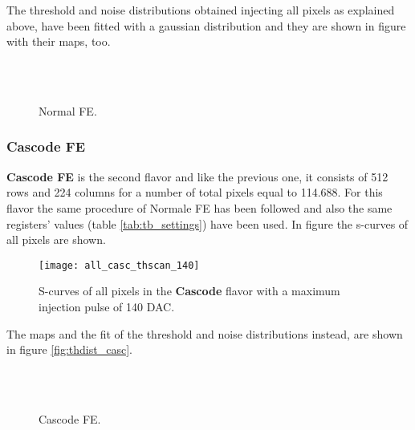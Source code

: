 The threshold and noise distributions obtained injecting all pixels as explained above, have been fitted with a gaussian distribution and they are shown in figure  with their maps, too.

\begin{figure}[h!]
\centering
{}\quad
{}\\
\quad
{}\\
\caption{Normal FE.}
\label{fig:thdist_norm}
\end{figure}



\subsubsection{Cascode FE}

\textbf{Cascode FE} is the second flavor and like the previous one, it consists of 512 rows and 224 columns for a number of total pixels equal to 114.688. For this flavor the same procedure of Normale FE has been followed and also the same registers' values (table \vref{tab:tb_settings}) have been used. %
In figure  the s-curves of all pixels are shown.

\begin{figure}[h!]
\centering
\texttt{[image: all\_casc\_thscan\_140]}
\caption{S-curves of all pixels in the \textbf{Cascode} flavor with a maximum injection pulse of 140 DAC.}
\label{fig:casc_scurve140}
\end{figure}

The maps and the fit of the threshold and noise distributions instead, are shown in figure \vref{fig:thdist_casc}.


\begin{figure}[h!]
\centering
{}\quad
{}\\
\quad
{}\\
\caption{Cascode FE.}
\label{fig:thdist_casc}
\end{figure}

